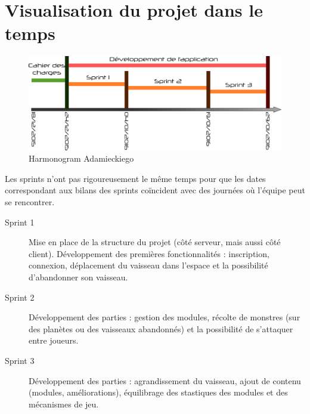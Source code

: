 \documentclass[a4paper,11pt]{report}
\begin{document}
    \section{Visualisation du projet dans le temps}
        \begin{figure}[H]
            \begin{center}
                \includegraphics[width=\textwidth]{gantt/gantt.png}
                \caption{Harmonogram Adamieckiego}
                \label{fig:gantt}
            \end{center}
        \end{figure}
        Les sprints n'ont pas rigoureusement le même temps pour que les dates correspondant aux bilans des sprints coïncident avec des journées où l'équipe peut se rencontrer.
        \begin{description}
            \item[Sprint 1] Mise en place de la structure du projet (côté serveur, mais aussi côté client). Développement des premières fonctionnalités : inscription, connexion, déplacement du vaisseau dans l'espace et la possibilité d'abandonner son vaisseau.
            \item[Sprint 2] Développement des parties : gestion des modules, récolte de monstres (sur des planètes ou des vaisseaux abandonnés) et la possibilité de s'attaquer entre joueurs.
            \item[Sprint 3] Développement des parties : agrandissement du vaisseau, ajout de contenu (modules, améliorations), équilibrage des stastiques des modules et des mécanismes de jeu.
        \end{description}
\end{document}
